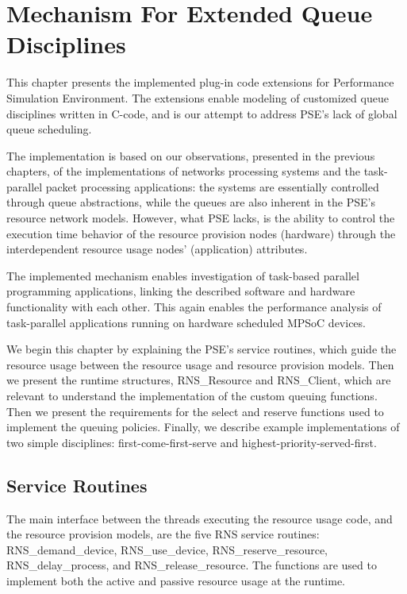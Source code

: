 \chapter{Mechanism For Extended Queue Disciplines}
\label{chapter:mechanism-for-extended-queue-disciplines}

This chapter presents the implemented plug-in code extensions for Performance Simulation Environment. The extensions enable modeling of customized queue disciplines written in C-code, and is our attempt to address PSE's lack of global queue scheduling.

The implementation is based on our observations, presented in the previous chapters, of the implementations of networks processing systems and the task-parallel packet processing applications: the systems are essentially controlled through queue abstractions, while the queues are also inherent in the PSE's resource network models. However, what PSE lacks, is the ability to control the execution time behavior of the resource provision nodes (hardware) through the interdependent resource usage nodes' (application) attributes.

The implemented mechanism enables investigation of task-based parallel programming applications, linking the described software and hardware functionality with each other. This again enables the performance analysis of task-parallel applications running on hardware scheduled MPSoC devices.

We begin this chapter by explaining the PSE's service routines, which guide the resource usage between the resource usage and resource provision models. Then we present the runtime structures, RNS\_Resource and RNS\_Client, which are relevant to understand the implementation of the custom queuing functions. Then we present the requirements for the select and reserve functions used to implement the queuing policies. Finally, we describe example implementations of two simple disciplines: first-come-first-serve and highest-priority-served-first.

\section{Service Routines}
The main interface between the threads executing the resource usage code, and the resource provision models, are the five RNS service routines: RNS\_demand\_device, RNS\_use\_device, RNS\_reserve\_resource, RNS\_delay\_process, and RNS\_release\_resource. The functions are used to implement both the active and passive resource usage at the runtime.

